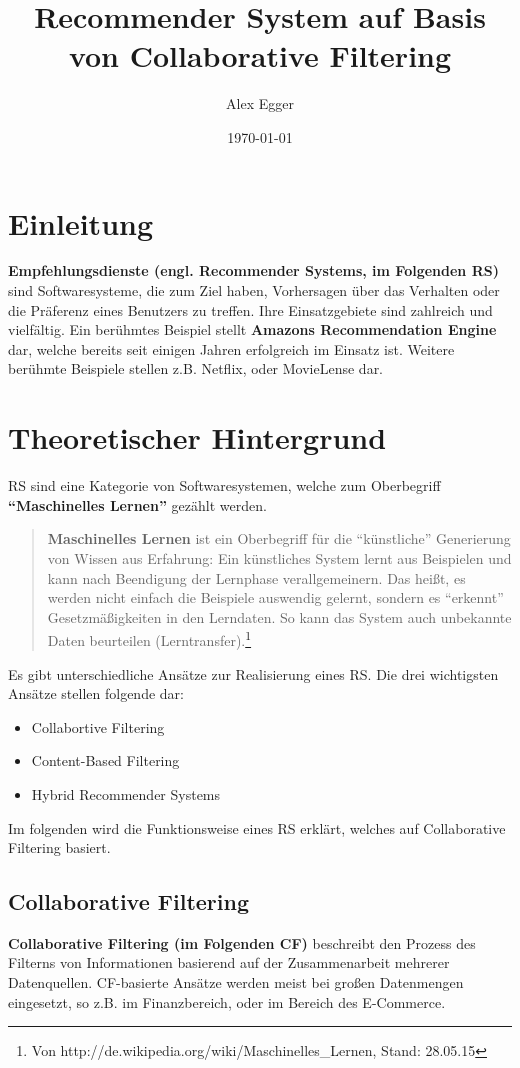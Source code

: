 \documentclass[german,a4paper]{article}
\title{Recommender System auf Basis von Collaborative Filtering}
\author{Alex Egger}
\date{\today}
\begin{document}
\maketitle
\newpage
\tableofcontents
\newpage

\section{Einleitung}
\textbf{Empfehlungsdienste (engl. Recommender Systems, im Folgenden RS)} sind Softwaresysteme, die zum Ziel haben, Vorhersagen über das Verhalten oder die Präferenz eines Benutzers zu treffen. Ihre Einsatzgebiete sind zahlreich und vielfältig. Ein berühmtes Beispiel stellt \textbf{Amazons Recommendation Engine} dar, welche bereits seit einigen Jahren erfolgreich im Einsatz ist. Weitere berühmte Beispiele stellen z.B. Netflix, oder MovieLense dar.
\section{Theoretischer Hintergrund}
RS sind eine Kategorie von Softwaresystemen, welche zum Oberbegriff \textbf{``Maschinelles Lernen''} gezählt werden.
\begin{quote}
\textbf{Maschinelles Lernen} ist ein Oberbegriff für die ``künstliche'' Generierung von Wissen aus Erfahrung: Ein künstliches System lernt aus Beispielen und kann nach Beendigung der Lernphase verallgemeinern. Das heißt, es werden nicht einfach die Beispiele auswendig gelernt, sondern es ``erkennt'' Gesetzmäßigkeiten in den Lerndaten. So kann das System auch unbekannte Daten beurteilen (Lerntransfer).\footnote{Von http://de.wikipedia.org/wiki/Maschinelles\_Lernen, Stand: 28.05.15}
\end{quote}
Es gibt unterschiedliche Ansätze zur Realisierung eines RS. Die drei wichtigsten Ansätze stellen folgende dar:
\begin{itemize}
\item Collabortive Filtering
\item Content-Based Filtering
\item Hybrid Recommender Systems
\end{itemize}
Im folgenden wird die Funktionsweise eines RS erklärt, welches auf Collaborative Filtering basiert.
\subsection{Collaborative Filtering}
\textbf{Collaborative Filtering (im Folgenden CF)} beschreibt den Prozess des Filterns von Informationen basierend auf der Zusammenarbeit mehrerer Datenquellen. CF-basierte Ansätze werden meist bei großen Datenmengen eingesetzt, so z.B. im Finanzbereich, oder im Bereich des E-Commerce. 
\end{document}
